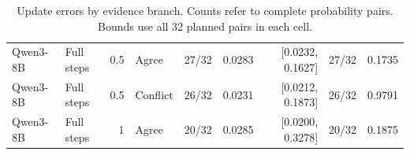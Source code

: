 \begin{table}[t]
{\begin{tabular*}{\textwidth}{@{\extracolsep{\fill}}llrlrrrrr@{}}
Qwen3-8B & Full steps & 0.5 & Agree & 27/32 & 0.0283 & [0.0232, 0.1627] & 27/32 & 0.1735 \\
Qwen3-8B & Full steps & 0.5 & Conflict & 26/32 & 0.0231 & [0.0212, 0.1873] & 26/32 & 0.9791 \\
Qwen3-8B & Full steps & 1 & Agree & 20/32 & 0.0285 & [0.0200, 0.3278] & 20/32 & 0.1875 \\
\bottomrule
\end{tabular*}
}
\caption{Update errors by evidence branch. Counts refer to complete probability pairs. Bounds use all 32 planned pairs in each cell.}
\label{tab:followup-updates-qwen}
\end{table}
